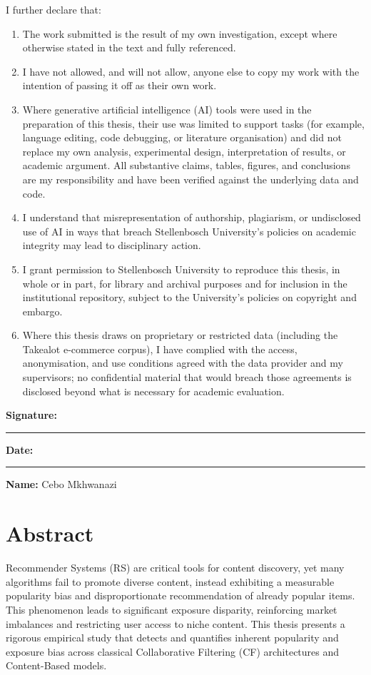 \documentclass[11pt,a4paper]{report}
\begin{document}
\vspace{0.75em}
\noindent I further declare that:
\begin{enumerate}
  \item The work submitted is the result of my own investigation, except where otherwise stated in the text and fully referenced.
  \item I have not allowed, and will not allow, anyone else to copy my work with the intention of passing it off as their own work.
  \item Where generative artificial intelligence (AI) tools were used in the preparation of this thesis, their use was limited to support tasks (for example, language editing, code debugging, or literature organisation) and did not replace my own analysis, experimental design, interpretation of results, or academic argument. All substantive claims, tables, figures, and conclusions are my responsibility and have been verified against the underlying data and code.
  \item I understand that misrepresentation of authorship, plagiarism, or undisclosed use of AI in ways that breach Stellenbosch University's policies on academic integrity may lead to disciplinary action.
  \item I grant permission to Stellenbosch University to reproduce this thesis, in whole or in part, for library and archival purposes and for inclusion in the institutional repository, subject to the University's policies on copyright and embargo.
  \item Where this thesis draws on proprietary or restricted data (including the Takealot e-commerce corpus), I have complied with the access, anonymisation, and use conditions agreed with the data provider and my supervisors; no confidential material that would breach those agreements is disclosed beyond what is necessary for academic evaluation.
\end{enumerate}

\vspace{1.5em}
\noindent\textbf{Signature:}\rule{6cm}{0.4pt}\hfill\textbf{Date:}\rule{3.5cm}{0.4pt}

\vspace{0.5em}
\noindent\textbf{Name:} Cebo Mkhwanazi

\chapter*{Abstract}
Recommender Systems (RS) are critical tools for content discovery, yet many algorithms fail to promote diverse content, instead exhibiting a measurable popularity bias and disproportionate recommendation of already popular items. This phenomenon leads to significant exposure disparity, reinforcing market imbalances and restricting user access to niche content. This thesis presents a rigorous empirical study that detects and quantifies inherent popularity and exposure bias across classical Collaborative Filtering (CF) architectures and Content-Based models.
\end{document}
